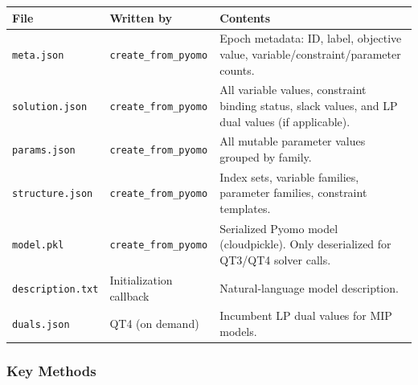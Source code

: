 \documentclass[11pt, a4paper]{article}
\begin{document}
\begin{longtable}{p{3.5cm} p{3cm} p{7.5cm}}
\toprule
\textbf{File} & \textbf{Written by} & \textbf{Contents} \\
\midrule
\texttt{meta.json} & \texttt{create\_from\_pyomo} & Epoch metadata: ID, label, objective value, variable/constraint/parameter counts. \\
\texttt{solution.json} & \texttt{create\_from\_pyomo} & All variable values, constraint binding status, slack values, and LP dual values (if applicable). \\
\texttt{params.json} & \texttt{create\_from\_pyomo} & All mutable parameter values grouped by family. \\
\texttt{structure.json} & \texttt{create\_from\_pyomo} & Index sets, variable families, parameter families, constraint templates. \\
\texttt{model.pkl} & \texttt{create\_from\_pyomo} & Serialized Pyomo model (cloudpickle). Only deserialized for QT3/QT4 solver calls. \\
\texttt{description.txt} & Initialization callback & Natural-language model description. \\
\texttt{duals.json} & QT4 (on demand) & Incumbent LP dual values for MIP models. \\
\bottomrule
\end{longtable}

\subsubsection{Key Methods}
\end{document}
